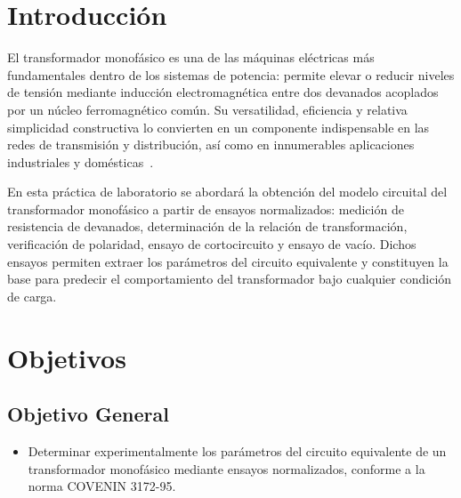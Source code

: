 \section{Introducción}

El transformador monofásico es una de las máquinas eléctricas más fundamentales dentro de los sistemas de potencia: permite elevar o reducir niveles de tensión mediante inducción electromagnética entre dos devanados acoplados por un núcleo ferromagnético común. Su versatilidad, eficiencia y relativa simplicidad constructiva lo convierten en un componente indispensable en las redes de transmisión y distribución, así como en innumerables aplicaciones industriales y domésticas~\cite{chapman,mit}.

En esta práctica de laboratorio se abordará la obtención del modelo circuital del transformador monofásico a partir de ensayos normalizados: medición de resistencia de devanados, determinación de la relación de transformación, verificación de polaridad, ensayo de cortocircuito y ensayo de vacío. Dichos ensayos permiten extraer los parámetros del circuito equivalente y constituyen la base para predecir el comportamiento del transformador bajo cualquier condición de carga.

\newpage

\section{Objetivos}

\subsection*{Objetivo General}
\begin{itemize}
    \item Determinar experimentalmente los parámetros del circuito equivalente de un transformador monofásico mediante ensayos normalizados, conforme a la norma COVENIN 3172-95.
\end{itemize}

